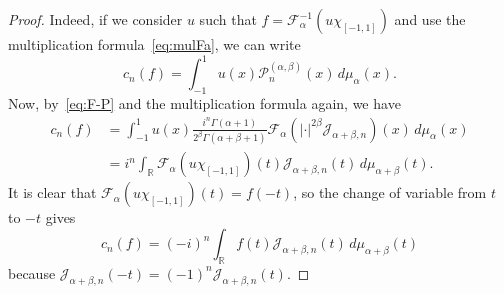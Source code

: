 \documentclass[11pt,a4paper]{amsart}
\theoremstyle{plain}
\theoremstyle{definition}
\newcommand{\R}{\mathbb{R}}
\newcommand{\calF}{\mathcal{F}}
\newcommand{\calJ}{\mathcal{J}}
\newcommand{\calP}{\mathcal{P}}
\begin{document}
\begin{proof}
Indeed, if we consider $u$ such that
$f = \calF_{\alpha}^{-1}(u\chi_{[-1,1]})$
and use the multiplication formula~\eqref{eq:mulFa}, we can write
\begin{equation*}
  c_n(f) = \int_{-1}^1 u(x) \calP^{(\alpha,\beta)}_n(x) \,d\mu_\alpha(x).
\end{equation*}
Now, by~\eqref{eq:F-P} and the multiplication formula again, we have
\begin{align*}
  c_n(f) &= \int_{-1}^1 u(x) \frac{i^n \Gamma(\alpha+1)}{2^\beta \Gamma(\alpha+\beta+1)}
  \calF_\alpha(|\cdot|^{2\beta} \calJ_{\alpha+\beta,n})(x) \,d\mu_\alpha(x) \\
  &= i^n \int_{\R} \calF_{\alpha}(u\chi_{[-1,1]})(t)
  \calJ_{\alpha+\beta,n}(t) \,d\mu_{\alpha+\beta}(t).
\end{align*}
It is clear that $\calF_{\alpha}(u\chi_{[-1,1]})(t) = f(-t)$, 
so the change of variable from $t$ to $-t$ gives
\begin{equation*}
  c_n(f) = (-i)^n \int_{\R} f(t) \calJ_{\alpha+\beta,n}(t)
  \,d\mu_{\alpha+\beta}(t)
\end{equation*}
because $\calJ_{\alpha+\beta,n}(-t) = (-1)^n \calJ_{\alpha+\beta,n}(t)$.
\end{proof}

\end{document}
